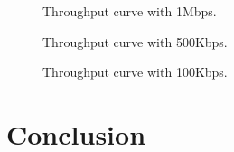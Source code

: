 \documentclass[]{article}
\begin{document}
\begin{figure}
    
   \caption{Throughput curve with 1Mbps.\label{fig:tp_1}}
\end{figure}

\begin{figure}
    
   \caption{Throughput curve with 500Kbps.\label{fig:tp_500}}
\end{figure}

\begin{figure}
    
   \caption{Throughput curve with 100Kbps.\label{fig:tp_100}}
\end{figure}

\section{Conclusion}


\end{document}
